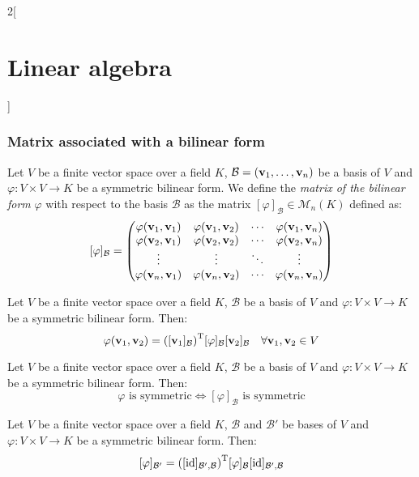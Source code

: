 \documentclass[../../../main.tex]{subfiles}
\begin{document}
\begin{multicols}{2}[\section{Linear algebra}]
  \subsubsection{Matrix associated with a bilinear form}
  \begin{definition}
    Let $V$ be a finite vector space over a field $K$, $\mathcal{B}=(\boldsymbol{\mathrm{v}}_1,\ldots,\boldsymbol{\mathrm{v}}_n)$ be a basis of $V$ and $\varphi:V\times V\rightarrow K$ be a symmetric bilinear form. We define the \emph{matrix of the bilinear form} $\varphi$ with respect to the basis $\mathcal{B}$ as the matrix $[\varphi]_\mathcal{B}\in\mathcal{M}_n(K)$ defined as: $$[\varphi]_\mathcal{B}=
      \begin{pmatrix}
        \varphi(\boldsymbol{\mathrm{v}}_1,\boldsymbol{\mathrm{v}}_1) & \varphi(\boldsymbol{\mathrm{v}}_1,\boldsymbol{\mathrm{v}}_2) & \cdots & \varphi(\boldsymbol{\mathrm{v}}_1,\boldsymbol{\mathrm{v}}_n) \\
        \varphi(\boldsymbol{\mathrm{v}}_2,\boldsymbol{\mathrm{v}}_1) & \varphi(\boldsymbol{\mathrm{v}}_2,\boldsymbol{\mathrm{v}}_2) & \cdots & \varphi(\boldsymbol{\mathrm{v}}_2,\boldsymbol{\mathrm{v}}_n) \\
        \vdots                                             & \vdots                                             & \ddots & \vdots                                             \\
        \varphi(\boldsymbol{\mathrm{v}}_n,\boldsymbol{\mathrm{v}}_1) & \varphi(\boldsymbol{\mathrm{v}}_n,\boldsymbol{\mathrm{v}}_2) & \cdots & \varphi(\boldsymbol{\mathrm{v}}_n,\boldsymbol{\mathrm{v}}_n) \\
      \end{pmatrix}$$
  \end{definition}
  \begin{lemma}
    Let $V$ be a finite vector space over a field $K$, $\mathcal{B}$ be a basis of $V$ and $\varphi:V\times V\rightarrow K$ be a symmetric bilinear form. Then:
    $$\varphi(\boldsymbol{\mathrm{v}}_1,\boldsymbol{\mathrm{v}}_2)={\left([\boldsymbol{\mathrm{v}}_1]_\mathcal{B}\right)}^\mathrm{T}[\varphi]_\mathcal{B}[\boldsymbol{\mathrm{v}}_2]_\mathcal{B}\quad\forall\boldsymbol{\mathrm{v}}_1,\boldsymbol{\mathrm{v}}_2\in V$$
  \end{lemma}
  \begin{prop}
    Let $V$ be a finite vector space over a field $K$, $\mathcal{B}$ be a basis of $V$ and $\varphi:V\times V\rightarrow K$ be a symmetric bilinear form. Then: $$\varphi\text{ is symmetric}\iff[\varphi]_\mathcal{B}\text{ is symmetric}$$
  \end{prop}
  \begin{prop}
    Let $V$ be a finite vector space over a field $K$, $\mathcal{B}$ and $\mathcal{B}'$ be bases of $V$ and $\varphi:V\times V\rightarrow K$ be a symmetric bilinear form. Then: $$[\varphi]_{\mathcal{B}'}={([\mathrm{id}]_{\mathcal{B}',\mathcal{B}})}^\mathrm{T}[\varphi]_\mathcal{B}[\mathrm{id}]_{\mathcal{B}',\mathcal{B}}$$
  \end{prop}

\end{multicols}
\end{document}
